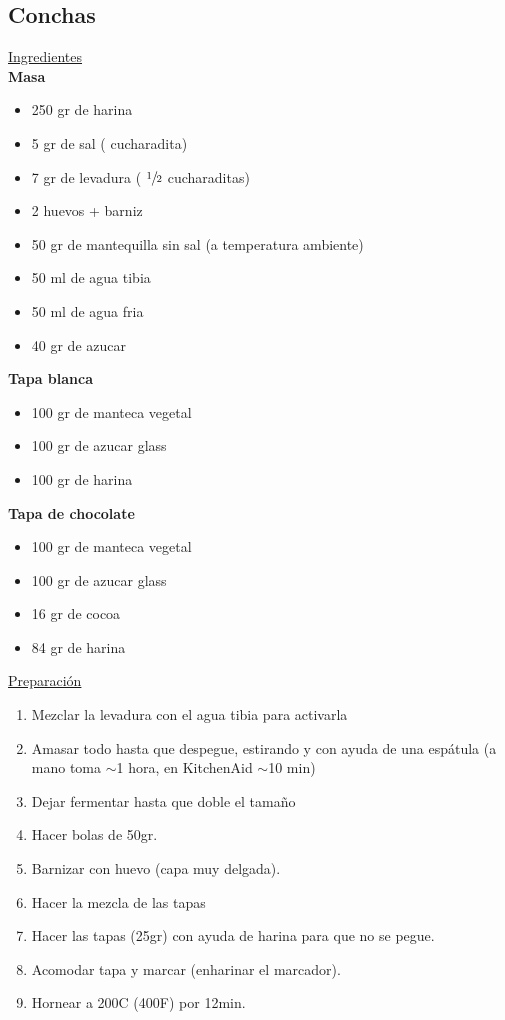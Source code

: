 \subsection{Conchas}

\underline{Ingredientes}\\
\textbf{Masa}
\begin{itemize}
\item 250 gr de harina
\item 5 gr de sal ( cucharadita)
\item 7 gr de levadura ( $\sfrac{1}{2}$ cucharaditas)
\item 2 huevos +  barniz
\item 50 gr de mantequilla sin sal (a temperatura ambiente)
\item 50 ml de agua tibia
\item 50 ml de agua fria
\item 40 gr de azucar
\end{itemize}


\textbf{Tapa blanca}
\begin{itemize}
\item 100 gr de manteca vegetal
\item 100 gr de azucar glass
\item 100 gr de harina
\end{itemize}

\textbf{Tapa de chocolate}
\begin{itemize}
\item 100 gr de manteca vegetal
\item 100 gr de azucar glass
\item 16 gr de cocoa
\item 84 gr de harina
\end{itemize}

\underline{Preparaci\'on}

\begin{enumerate}
\item Mezclar la levadura con el agua tibia para activarla
\item Amasar todo hasta que despegue, estirando y con ayuda de una espátula (a mano toma $\sim$1 hora, en KitchenAid $\sim$10 min)
\item Dejar fermentar hasta que doble el tamaño
\item Hacer bolas de 50gr.
\item Barnizar con huevo (capa muy delgada).
\item Hacer la mezcla de las tapas
\item Hacer las tapas (25gr) con ayuda de harina para que no se pegue. 
\item Acomodar tapa y marcar (enharinar el marcador).
\item Hornear a 200C (400F) por 12min.
\end{enumerate}
